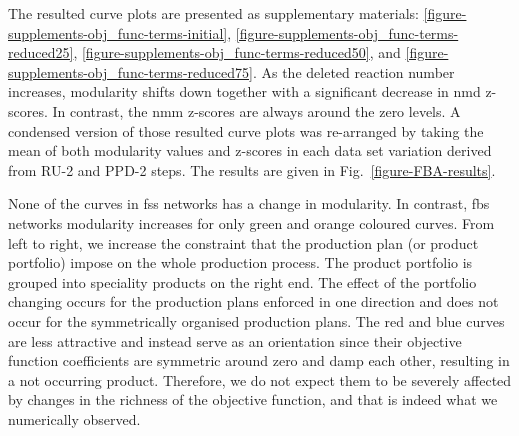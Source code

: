 The resulted curve plots are presented as supplementary materials: \ref{figure-supplements-obj_func-terms-initial}, \ref{figure-supplements-obj_func-terms-reduced25}, \ref{figure-supplements-obj_func-terms-reduced50}, and \ref{figure-supplements-obj_func-terms-reduced75}. As the deleted reaction number increases, modularity shifts down together with a significant decrease in \acs{nmd} z-scores. In contrast, the \acs{nmm} z-scores are always around the zero levels. A condensed version of those resulted curve plots was re-arranged by taking the mean of both modularity values and z-scores in each data set variation derived from RU-2 and PPD-2 steps. The results are given in Fig.~\ref{figure-FBA-results}.

None of the curves in \acs{fss} networks has a change in modularity. In contrast, \acs{fbs} networks modularity increases for only green and orange coloured curves. From left to right, we increase the constraint that the production plan (or product portfolio) impose on the whole production process. The product portfolio is grouped into speciality products on the right end. The effect of the portfolio changing occurs for the production plans enforced in one direction and does not occur for the symmetrically organised production plans. The red and blue curves are less attractive and instead serve as an orientation since their objective function coefficients are symmetric around zero and damp each other, resulting in a not occurring product. Therefore, we do not expect them to be severely affected by changes in the richness of the objective function, and that is indeed what we numerically observed.



